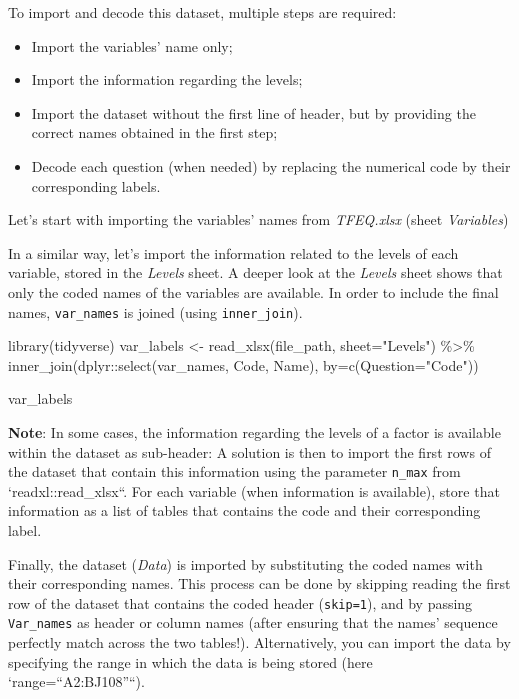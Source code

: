 \documentclass[
]{book}
\newenvironment{Shaded}{\begin{snugshade}}{\end{snugshade}}
\newcommand{\AttributeTok}[1]{\textcolor[rgb]{0.77,0.63,0.00}{#1}}
\newcommand{\FunctionTok}[1]{\textcolor[rgb]{0.00,0.00,0.00}{#1}}
\newcommand{\NormalTok}[1]{#1}
\newcommand{\OtherTok}[1]{\textcolor[rgb]{0.56,0.35,0.01}{#1}}
\newcommand{\SpecialCharTok}[1]{\textcolor[rgb]{0.00,0.00,0.00}{#1}}
\newcommand{\StringTok}[1]{\textcolor[rgb]{0.31,0.60,0.02}{#1}}
\providecommand{\tightlist}{%
  \setlength{\itemsep}{0pt}\setlength{\parskip}{0pt}}
\begin{document}
To import and decode this dataset, multiple steps are required:

\begin{itemize}
\tightlist
\item
  Import the variables' name only;
\item
  Import the information regarding the levels;
\item
  Import the dataset without the first line of header, but by providing the correct names obtained in the first step;
\item
  Decode each question (when needed) by replacing the numerical code by their corresponding labels.
\end{itemize}

Let's start with importing the variables' names from \emph{TFEQ.xlsx} (sheet \emph{Variables})

In a similar way, let's import the information related to the levels of each variable, stored in the \emph{Levels} sheet.
A deeper look at the \emph{Levels} sheet shows that only the coded names of the variables are available. In order to include the final names, \texttt{var\_names} is joined (using \texttt{inner\_join}).

\begin{Shaded}
\begin{Highlighting}[]
\FunctionTok{library}\NormalTok{(tidyverse)}
\NormalTok{var\_labels }\OtherTok{\textless{}{-}} \FunctionTok{read\_xlsx}\NormalTok{(file\_path, }\AttributeTok{sheet=}\StringTok{"Levels"}\NormalTok{) }\SpecialCharTok{\%\textgreater{}\%} 
  \FunctionTok{inner\_join}\NormalTok{(dplyr}\SpecialCharTok{::}\FunctionTok{select}\NormalTok{(var\_names, Code, Name), }\AttributeTok{by=}\FunctionTok{c}\NormalTok{(}\AttributeTok{Question=}\StringTok{"Code"}\NormalTok{))}

\NormalTok{var\_labels}
\end{Highlighting}
\end{Shaded}

\textbf{Note}: In some cases, the information regarding the levels of a factor is available within the dataset as sub-header: A solution is then to import the first rows of the dataset that contain this information using the parameter \texttt{n\_max} from `readxl::read\_xlsx``. For each variable (when information is available), store that information as a list of tables that contains the code and their corresponding label.

Finally, the dataset (\emph{Data}) is imported by substituting the coded names with their corresponding names.
This process can be done by skipping reading the first row of the dataset that contains the coded header (\texttt{skip=1}), and by passing \texttt{Var\_names} as header or column names (after ensuring that the names' sequence perfectly match across the two tables!).
Alternatively, you can import the data by specifying the range in which the data is being stored (here `range=``A2:BJ108''``).
\end{document}
